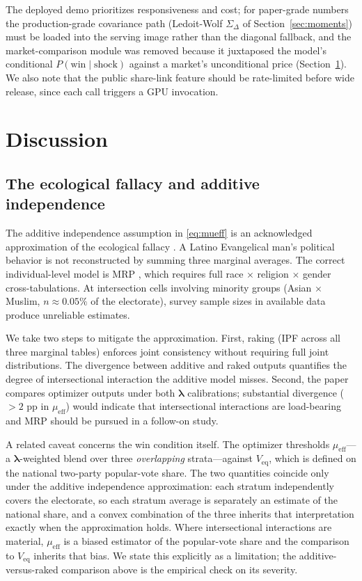 \documentclass[12pt, letterpaper]{article}
\theoremstyle{definition}
\newcommand{\mueff}{\mu_{\mathrm{eff}}}
\newcommand{\Veq}{V_{\mathrm{eq}}}
\newcommand{\SigmaDelta}{\Sigma_{\Delta}}
\begin{document}
The deployed demo prioritizes responsiveness and cost; for paper-grade numbers the
production-grade covariance path (Ledoit-Wolf $\SigmaDelta$ of
Section~\ref{sec:moments}) must be loaded into the serving image rather than the
diagonal fallback, and the market-comparison module was removed because it juxtaposed
the model's conditional $P(\text{win}\mid\text{shock})$ against a market's unconditional
price (Section~\ref{sec:discussion}). We also note that the public share-link feature
should be rate-limited before wide release, since each call triggers a GPU invocation.

\section{Discussion}
\label{sec:discussion}

\subsection{The ecological fallacy and additive independence}
\label{sec:eco_fallacy}

The additive independence assumption in \eqref{eq:mueff} is an acknowledged
approximation of the ecological fallacy \citep{Robinson1950}. A Latino
Evangelical man's political behavior is not reconstructed by summing three
marginal averages. The correct individual-level model is MRP \citep{Park2004},
which requires full race $\times$ religion $\times$ gender cross-tabulations.
At intersection cells involving minority groups (Asian $\times$ Muslim, $n
\approx 0.05\%$ of the electorate), survey sample sizes in available data
produce unreliable estimates.

We take two steps to mitigate the approximation. First, raking (IPF across
all three marginal tables) enforces joint consistency without requiring full
joint distributions. The divergence between additive and raked outputs
quantifies the degree of intersectional interaction the additive model
misses. Second, the paper compares optimizer outputs under both $\boldsymbol{\lambda}$
calibrations; substantial divergence ($>2$ pp in $\mueff$) would indicate
that intersectional interactions are load-bearing and MRP should be pursued
in a follow-on study.

A related caveat concerns the win condition itself. The optimizer thresholds
$\mueff$---a $\boldsymbol{\lambda}$-weighted blend over three
\emph{overlapping} strata---against $\Veq$, which is defined on the national
two-party popular-vote share. The two quantities coincide only under the
additive independence approximation: each stratum independently covers the
electorate, so each stratum average is separately an estimate of the national
share, and a convex combination of the three inherits that interpretation
exactly when the approximation holds. Where intersectional interactions are
material, $\mueff$ is a biased estimator of the popular-vote share and the
comparison to $\Veq$ inherits that bias. We state this explicitly as a
limitation; the additive-versus-raked comparison above is the empirical check
on its severity.
\end{document}
